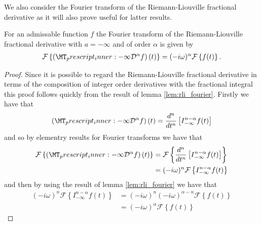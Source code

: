 We also consider the Fourier transform of the Riemann-Liouville fractional derivative as it will also prove useful for latter results.

\begin{lemma}
    \label{lem:rld_fourier}
    For an admissable function $ f $ the Fourier transform of the Riemann-Liouville fractional derivative with $ a = -\infty $ and of order $ \alpha $ is given by
    \begin{align}
        \mathcal{F}\left\{ \left(\prescript{}{-\infty}{\mathcal{D}}^\alpha f\right)(t) \right\} = (-i\omega)^{\alpha} \mathcal{F}\left\{ f(t) \right\}.
    \end{align}
\end{lemma}
\begin{proof}
    Since it is possible to regard the Riemann-Liouville fractional derivative in terms of the composition of integer order derivatives with the fractional integral this proof follows quickly from the result of lemma \ref{lem:rli_fourier}.
    Firstly we have that
    \begin{align}
        \left(\prescript{}{-\infty}{\mathcal{D}}^\alpha f\right)(t) = \frac{d^n}{dt^n} \left[ I_{-\infty}^{n - \alpha} f(t)\right]
    \end{align}
    and so by elementry results for Fourier transforms we have that
    \begin{align}
        \mathcal{F}\left\{ \left(\prescript{}{-\infty}{\mathcal{D}}^\alpha f\right)(t) \right\}  &=
        \mathcal{F}\left\{ \frac{d^n}{dt^n} \left[ I_{-\infty}^{n-\alpha} f(t) \right] \right\} \\
        &= (-i\omega)^{n} \mathcal{F}\left\{ I_{-\infty}^{n-\alpha} f(t) \right\}
    \end{align}
    and then by using the result of lemma \ref{lem:rli_fourier} we have that
    \begin{align}
        (-i\omega)^{n} \mathcal{F}\left\{ I_{-\infty}^{n-\alpha} f(t) \right\} &= (-i\omega)^{n}(-i\omega)^{\alpha - n}\mathcal{F}\left\{ f(t)\right\} \\
        &= (-i\omega)^\alpha  \mathcal{F}\left\{ f(t) \right\}
    \end{align}
\end{proof}

